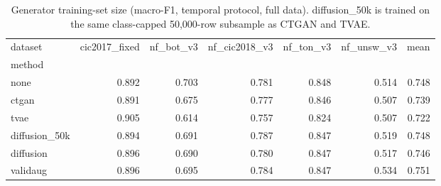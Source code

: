 \begin{table}[t]
\centering\small
\caption{Generator training-set size (macro-F1, temporal protocol, full data). diffusion\_50k is trained on the same class-capped 50,000-row subsample as CTGAN and TVAE.}
\label{tab:d50}
\begin{tabular}{lrrrrrr}
\toprule
dataset & cic2017\_fixed & nf\_bot\_v3 & nf\_cic2018\_v3 & nf\_ton\_v3 & nf\_unsw\_v3 & mean \\
method &  &  &  &  &  &  \\
\midrule
none & 0.892 & 0.703 & 0.781 & 0.848 & 0.514 & 0.748 \\
ctgan & 0.891 & 0.675 & 0.777 & 0.846 & 0.507 & 0.739 \\
tvae & 0.905 & 0.614 & 0.757 & 0.824 & 0.507 & 0.722 \\
diffusion\_50k & 0.894 & 0.691 & 0.787 & 0.847 & 0.519 & 0.748 \\
diffusion & 0.896 & 0.690 & 0.780 & 0.847 & 0.517 & 0.746 \\
validaug & 0.896 & 0.695 & 0.784 & 0.847 & 0.534 & 0.751 \\
\bottomrule
\end{tabular}
\end{table}
